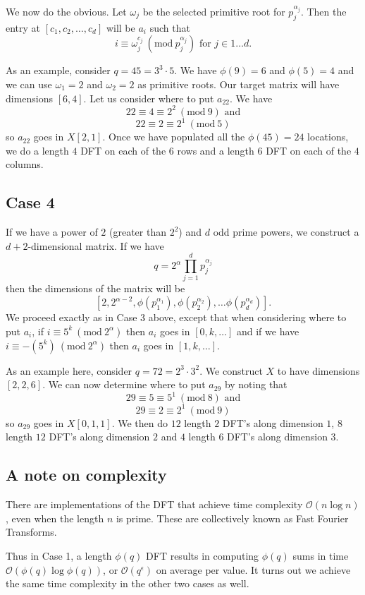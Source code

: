 \documentclass[12pt]{amsart}
\newcommand{\Mod}[1]{\ (\mathrm{mod}\ #1)}
\theoremstyle{remark}
\numberwithin{theorem}{section}
\numberwithin{equation}{section}
\begin{document}
We now do the obvious. Let $\omega_j$ be the selected primitive root for $p_j^{\alpha_j}$. Then the entry at $[c_1,c_2,\ldots,c_d]$ will be $a_i$ such that
$$
i \equiv\omega_j^{c_j}\Mod {p_j^{\alpha_j}}\textrm{ for }j\in{1\ldots d}.
$$

As an example, consider $q=45=3^3\cdot 5$. We have $\phi(9)=6$ and $\phi(5)=4$ and we can use $\omega_1=2$ and $\omega_2=2$ as primitive roots. Our target matrix will have dimensions $[6,4]$. Let us consider where to put $a_{22}$. We have
$$
22\equiv 4 \equiv 2^2\Mod{9}\textrm{ and}
$$
$$
22\equiv 2 \equiv 2^1\Mod{5}
$$
so $a_{22}$ goes in $X[2,1]$. Once we have populated all the $\phi(45)=24$ locations, we do a length $4$ DFT on each of the $6$ rows and a length $6$ DFT on each of the $4$ columns. 

\subsection{Case 4}

If we have a power of $2$ (greater than $2^2$) and $d$ odd prime powers, we construct a $d+2$-dimensional matrix.
If we have
$$
q=2^\alpha\prod_{j=1}^dp_j^{\alpha_j}
$$
then the dimensions of the matrix will be
$$
[2,2^{\alpha-2},\phi(p_1^{\alpha_1}),\phi(p_2^{\alpha_2}),\ldots\phi(p_d^{\alpha_d})].
$$
We proceed exactly as in Case 3 above, except that when considering where to put $a_i$, if $i\equiv 5^k\Mod{2^\alpha}$ then $a_i$ goes in $[0,k,\ldots]$ and if we have $i\equiv -(5^k)\Mod{2^\alpha}$ then $a_i$ goes in $[1,k,\ldots]$.

As an example here, consider $q=72=2^3\cdot3^2$. We construct $X$ to have dimensions $[2,2,6]$. We can now determine where to put $a_{29}$ by noting that
$$
29\equiv 5 \equiv 5^1 \Mod{8}\textrm{ and}
$$
$$
29\equiv 2 \equiv 2^1 \Mod{9}
$$
so $a_{29}$ goes in $X[0,1,1]$. We then do $12$ length $2$ DFT's along dimension $1$, $8$ length $12$ DFT's along dimension $2$ and $4$ length $6$ DFT's along dimension $3$.

\subsection{A note on complexity}

There are implementations of the DFT that achieve time complexity $\mathcal{O}(n\log n)$, even when the length $n$ is prime. These are collectively known as Fast Fourier Transforms.

Thus in Case 1, a length $\phi(q)$ DFT results in computing $\phi(q)$ sums in time $\mathcal{O}(\phi(q)\log\phi(q))$, or $\mathcal{O}(q^\epsilon)$ on average per value. It turns out we achieve the same time complexity in the other two cases as well.
\end{document}
